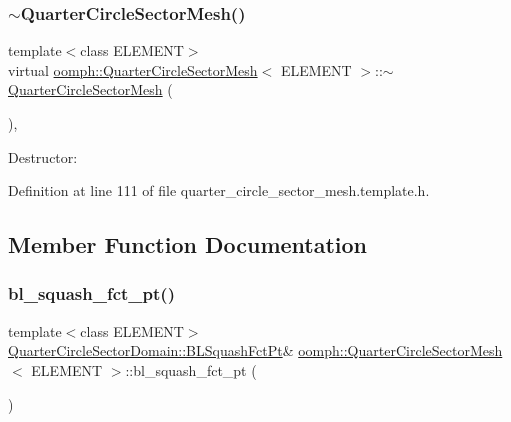 \mbox{\label{classoomph_1_1QuarterCircleSectorMesh_af3aec899bd005cacb011c13bcb6e5f22}} 
\subsubsection{\texorpdfstring{$\sim$\+Quarter\+Circle\+Sector\+Mesh()}{~QuarterCircleSectorMesh()}}
{\footnotesize\ttfamily template$<$class E\+L\+E\+M\+E\+NT$>$ \\
virtual \hyperlink{classoomph_1_1QuarterCircleSectorMesh}{oomph\+::\+Quarter\+Circle\+Sector\+Mesh}$<$ E\+L\+E\+M\+E\+NT $>$\+::$\sim$\hyperlink{classoomph_1_1QuarterCircleSectorMesh}{Quarter\+Circle\+Sector\+Mesh} (\begin{DoxyParamCaption}{ }\end{DoxyParamCaption})\hspace{0.3cm}{\ttfamily [inline]}, {\ttfamily [virtual]}}



Destructor\+: 



Definition at line 111 of file quarter\+\_\+circle\+\_\+sector\+\_\+mesh.\+template.\+h.



\subsection{Member Function Documentation}
\mbox{\label{classoomph_1_1QuarterCircleSectorMesh_a6f149022d7a40bd0efed49adacd716bf}} 
\subsubsection{\texorpdfstring{bl\+\_\+squash\+\_\+fct\+\_\+pt()}{bl\_squash\_fct\_pt()}}
{\footnotesize\ttfamily template$<$class E\+L\+E\+M\+E\+NT$>$ \\
\hyperlink{classoomph_1_1QuarterCircleSectorDomain_a6cffab57f87c9f4ab01744647240bb1e}{Quarter\+Circle\+Sector\+Domain\+::\+B\+L\+Squash\+Fct\+Pt}\& \hyperlink{classoomph_1_1QuarterCircleSectorMesh}{oomph\+::\+Quarter\+Circle\+Sector\+Mesh}$<$ E\+L\+E\+M\+E\+NT $>$\+::bl\+\_\+squash\+\_\+fct\+\_\+pt (\begin{DoxyParamCaption}{ }\end{DoxyParamCaption})\hspace{0.3cm}{\ttfamily [inline]}}



